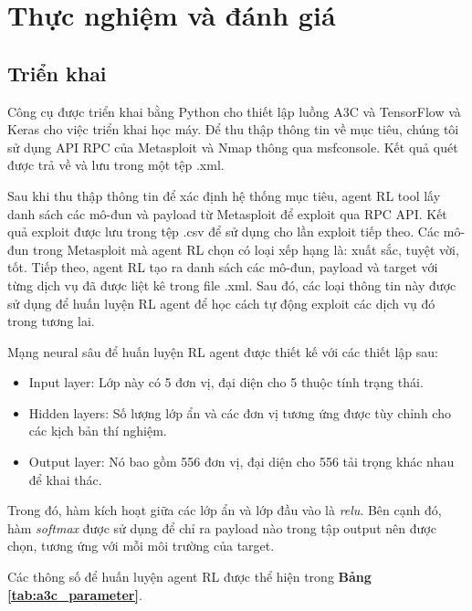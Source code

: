 \chapter{Thực nghiệm và đánh giá}
\label{chapter4}
\section{Triển khai}
Công cụ được triển khai bằng Python cho thiết lập luồng A3C và TensorFlow và Keras cho việc triển khai học máy. Để thu thập thông tin về mục tiêu, chúng tôi sử dụng API RPC của Metasploit và Nmap thông qua msfconsole. Kết quả quét được trả về và lưu trong một tệp .xml.

Sau khi thu thập thông tin để xác định hệ thống mục tiêu, agent RL tool lấy danh sách các mô-đun và payload từ Metasploit để exploit qua RPC API. Kết quả exploit được lưu trong tệp .csv để sử dụng cho lần exploit tiếp theo. Các mô-đun trong Metasploit mà agent RL chọn có loại xếp hạng là: xuất sắc, tuyệt vời, tốt. Tiếp theo, agent RL tạo ra danh sách các mô-đun, payload và target với từng dịch vụ đã được liệt kê trong file .xml. Sau đó, các loại thông tin này được sử dụng để huấn luyện RL agent để học cách tự động exploit các dịch vụ đó trong tương lai.

Mạng neural sâu để huấn luyện RL agent được thiết kế với các thiết lập sau: 
\begin{itemize}
    \item Input layer: Lớp này có 5 đơn vị, đại diện cho 5 thuộc tính trạng thái.
    \item Hidden layers: Số lượng lớp ẩn và các đơn vị tương ứng được tùy chỉnh cho các kịch bản thí nghiệm.
    \item Output layer: Nó bao gồm 556 đơn vị, đại diện cho 556 tải trọng khác nhau để khai thác.
\end{itemize}

Trong đó, hàm kích hoạt giữa các lớp ẩn và lớp đầu vào là \textit{relu}. Bên cạnh đó, hàm \textit{softmax} được sử dụng để chỉ ra payload nào trong tập output nên được chọn, tương ứng với mỗi môi trường của target.

Các thông số để huấn luyện agent RL được thể hiện trong \textbf{Bảng \ref{tab:a3c_parameter}}.

